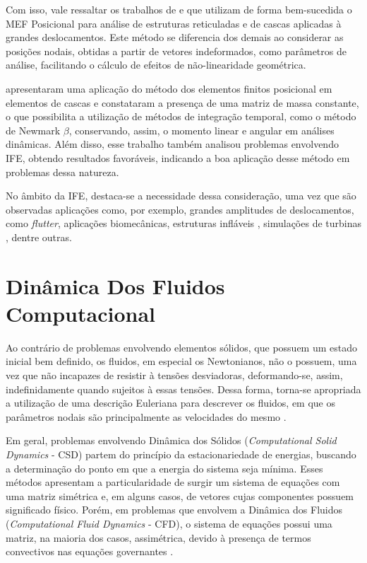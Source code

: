 Com isso, vale ressaltar os trabalhos de  e  que utilizam de forma bem-sucedida o MEF Posicional para análise de estruturas reticuladas e de cascas aplicadas à grandes deslocamentos. Este método se diferencia dos demais ao considerar as posições nodais, obtidas a partir de vetores indeformados, como parâmetros de análise, facilitando o cálculo de efeitos de não-linearidade geométrica.

 apresentaram uma aplicação do método dos elementos finitos posicional em elementos de cascas e constataram a presença de uma matriz de massa constante, o que possibilita a utilização de métodos de integração temporal, como o método de Newmark $\beta$, conservando, assim, o momento linear e angular em análises dinâmicas. Além disso, esse trabalho também analisou problemas envolvendo IFE, obtendo resultados favoráveis, indicando a boa aplicação desse método em problemas dessa natureza.

No âmbito da IFE, destaca-se a necessidade dessa consideração, uma vez que são observadas aplicações como, por exemplo, grandes amplitudes de deslocamentos, como \textit{flutter}, aplicações biomecânicas, estruturas infláveis \cite{karagiozis2011computational}, simulações de turbinas \cite{bazilevs20113d}, dentre outras.

\section{Dinâmica Dos Fluidos Computacional} \label{CFD}

Ao contrário de problemas envolvendo elementos sólidos, que possuem um estado inicial bem definido, os fluidos, em especial os Newtonianos, não o possuem, uma vez que não incapazes de resistir à tensões desviadoras, deformando-se, assim, indefinidamente quando sujeitos à essas tensões. Dessa forma, torna-se apropriada a utilização de uma descrição Euleriana para descrever os fluidos, em que os parâmetros nodais são principalmente as velocidades do mesmo \cite{fernandes2020tecnica}.

Em geral, problemas envolvendo Dinâmica dos Sólidos (\textit{Computational Solid Dynamics} - CSD) partem do princípio da estacionariedade de energias, buscando a determinação do ponto em que a energia do sistema seja mínima. Esses métodos apresentam a particularidade de surgir um sistema de equações com uma matriz simétrica e, em alguns casos, de vetores cujas componentes possuem significado físico. Porém, em problemas que envolvem a Dinâmica dos Fluidos (\textit{Computational Fluid Dynamics} - CFD), o sistema de equações possui uma matriz, na maioria dos casos, assimétrica, devido à presença de termos convectivos nas equações governantes \cite{bazilevs2013computational,brooks1982streamline}.

